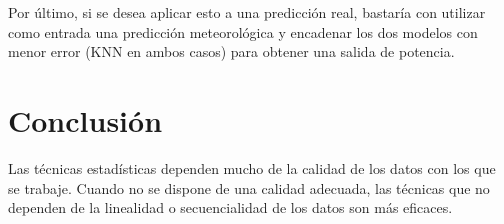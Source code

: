 \documentclass[journal]{IEEEtran}
\begin{document}
Por último, si se desea aplicar esto a una predicción real, bastaría con utilizar como entrada una predicción meteorológica y encadenar los dos modelos con menor error (KNN en ambos casos) para obtener una salida de potencia.

\section{Conclusión}
Las técnicas estadísticas dependen mucho de la calidad de los datos con los que se trabaje. Cuando no se dispone de una calidad adecuada, las técnicas que no dependen de la linealidad o secuencialidad de los datos son más eficaces.







%







\medskip





\ifCLASSOPTIONcaptionsoff
  \newpage
\fi
\end{document}
